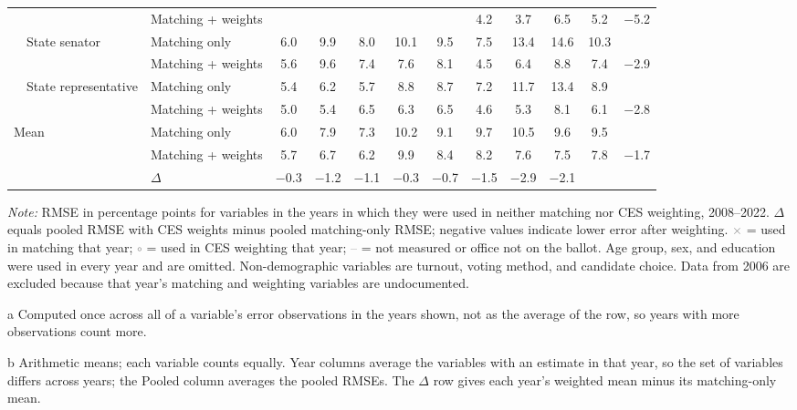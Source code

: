 \begin{table}[!htbp]
{\begin{threeparttable}
\begin{tabular}{llcccccccccc}
 & Matching + weights &  &  &  &  &  & 4.2 & 3.7 & 6.5 & 5.2 & $-$5.2 \\
\addlinespace[0.1em]
~~State senator & Matching only & 6.0 & 9.9 & 8.0 & 10.1 & 9.5 & 7.5 & 13.4 & 14.6 & 10.3 & \\
 & Matching + weights & 5.6 & 9.6 & 7.4 & 7.6 & 8.1 & 4.5 & 6.4 & 8.8 & 7.4 & $-$2.9 \\
\addlinespace[0.1em]
~~State representative & Matching only & 5.4 & 6.2 & 5.7 & 8.8 & 8.7 & 7.2 & 11.7 & 13.4 & 8.9 & \\
 & Matching + weights & 5.0 & 5.4 & 6.5 & 6.3 & 6.5 & 4.6 & 5.3 & 8.1 & 6.1 & $-$2.8 \\
\midrule
Mean\tnote{b} & Matching only & 6.0 & 7.9 & 7.3 & 10.2 & 9.1 & 9.7 & 10.5 & 9.6 & 9.5 & \\
 & Matching + weights & 5.7 & 6.7 & 6.2 & 9.9 & 8.4 & 8.2 & 7.6 & 7.5 & 7.8 & $-$1.7 \\
 & $\Delta$ & $-$0.3 & $-$1.2 & $-$1.1 & $-$0.3 & $-$0.7 & $-$1.5 & $-$2.9 & $-$2.1 & & \\
\bottomrule
\end{tabular}
\begin{tablenotes}
\footnotesize
\item \textit{Note:} RMSE in percentage points for variables in the years in which they were used in neither matching nor CES weighting, 2008--2022. $\Delta$ equals pooled RMSE with CES weights minus pooled matching-only RMSE; negative values indicate lower error after weighting. \textcolor{gray}{$\times$} = used in matching that year; \textcolor{gray}{$\circ$} = used in CES weighting that year; \textcolor{gray}{--} = not measured or office not on the ballot. Age group, sex, and education were used in every year and are omitted. Non-demographic variables are turnout, voting method, and candidate choice. Data from 2006 are excluded because that year's matching and weighting variables are undocumented.
\item[a] Computed once across all of a variable's error observations in the years shown, not as the average of the row, so years with more observations count more.
\item[b] Arithmetic means; each variable counts equally. Year columns average the variables with an estimate in that year, so the set of variables differs across years; the Pooled column averages the pooled RMSEs. The $\Delta$ row gives each year's weighted mean minus its matching-only mean.
\end{tablenotes}
\end{threeparttable}%
}
\end{table}